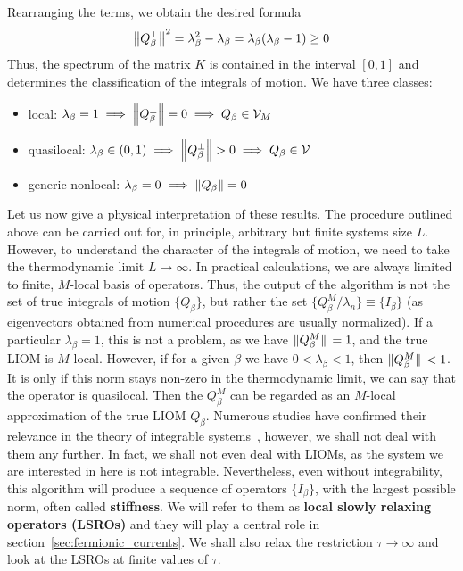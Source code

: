   Rearranging the terms, we obtain the desired formula
  \begin{equation}
    \norm{Q_{\beta}^{\perp}}^2 = \lambda_{\beta}^2 - \lambda_{\beta} = \lambda_{\beta} (\lambda_{\beta} - 1) \geq 0
    \label{eq:liom_norm}
  \end{equation}
Thus, the spectrum of the matrix \(K\) is contained in the interval \([0,1]\) and
 determines the classification of the integrals of motion. We have three classes:
 \begin{itemize}
    \item local: \(\lambda_{\beta} = 1 \implies \norm{Q_{\beta}^{\perp}} = 0 \implies Q_{\beta} \in \mathcal{V}_M\)
    \item quasilocal: \(\lambda_{\beta} \in \left(0,1\right) \implies \norm{Q_{\beta}^{\perp}} > 0 \implies Q_{\beta} \in \mathcal{V} \)
    \item generic nonlocal: \(\lambda_{\beta} = 0 \implies \norm{Q_{\beta}} = 0\)
  \end{itemize}
  Let us now give a physical interpretation of these results. The procedure outlined above
  can be carried out for, in principle, arbitrary but finite systems size \(L\). However,
  to understand the character of the integrals of motion, we need to take the thermodynamic
  limit \(L\to\infty\). In practical calculations, we are always limited to finite, \(M\)-local basis
  of operators. Thus, the output of the algorithm is not the set of true integrals of motion \(\{Q_{\beta}\}\),
  but rather the set \(\{Q_{\beta}^M/\lambda_n\} \equiv \{I_{\beta}\}\) (as eigenvectors obtained from numerical
  procedures are usually normalized). If a particular \(\lambda_{\beta} = 1\), this
  is not a problem, as we have \(\norm*{Q^M_{\beta}} = 1\), and the true LIOM is \(M\)-local. However, if 
  for a given \({\beta}\) we have \(0 < \lambda_{\beta} < 1\), then \(\norm*{Q^M_{\beta}} < 1\). It is only if this norm
  stays non-zero in the thermodynamic limit, we can say that the operator is quasilocal. Then the \(Q_{\beta}^M\)
can be regarded as an \(M\)-local approximation of the true LIOM \(Q_{\beta}\).
  Numerous studies have confirmed their relevance in the theory of integrable 
  systems~\autocite{Ilievski2015, Ilievski2015b, Prosen2013, Prosen2014},
  however, we shall not deal with them any further. In fact, we shall not even deal with LIOMs, as
  the system we are interested in here is not integrable. Nevertheless, even without integrability,
  this algorithm will produce a sequence of operators \(\{I_{\beta}\}\), with the largest possible norm,
  often called \textbf{stiffness}. We will refer to them as \textbf{local slowly relaxing operators (LSROs)}
  and they will play a central role in section~\ref{sec:fermionic_currents}. We shall also relax the restriction
  \(\tau\to\infty\) and look at the LSROs at finite values of \(\tau\).

